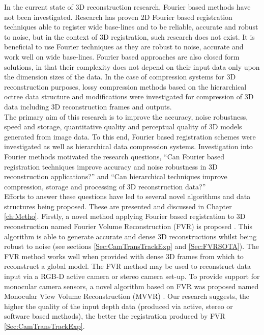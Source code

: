 In the current state of 3D reconstruction research, Fourier based methods have not been investigated. Research has proven 2D Fourier based registration techniques able to register wide base-lines and to be reliable, accurate and robust to noise, but in the context of 3D registration, such research does not exist. It is beneficial to use Fourier techniques as they are robust to noise, accurate and work well on wide base-lines. Fourier based approaches are also closed form solutions, in that their complexity does not depend on their input data only upon the dimension sizes of the data. In the case of compression systems for 3D reconstruction purposes, lossy compression methods based on the hierarchical octree data structure and modifications \cite{Lincoln13Interpolating} were investigated for compression of 3D data including 3D reconstruction frames and outputs. \\

The primary aim of this research is to improve the accuracy, noise robustness, speed and storage, quantitative quality and perceptual quality of 3D models generated from image data. To this end, Fourier based registration schemes were investigated as well as hierarchical data compression systems. Investigation into Fourier methods motivated the research questions, ``Can Fourier based registration techniques improve accuracy and noise robustness in 3D reconstruction applications?'' and ``Can hierarchical techniques improve compression, storage and processing of 3D reconstruction data?'' \\

Efforts to answer these questions have led to several novel algorithms and data structures being proposed. These are presented and discussed in Chapter \ref{ch:Metho}. Firstly, a novel method applying Fourier based registration to 3D reconstruction named Fourier Volume Reconstruction (FVR) is proposed \cite{Lincoln16Fourier,Lincoln16Dense}. This algorithm is able to generate accurate and dense 3D reconstructions whilst being robust to noise (see sections \ref{Sec:CamTransTrackExp} and \ref{Sec:FVRSOTA}). The FVR method works well when provided with dense 3D frames from which to reconstruct a global model. The FVR method may be used to reconstruct data input via a RGB-D active camera or stereo camera set-up. To provide support for monocular camera sensors, a novel algorithm based on FVR was proposed named Monocular View Volume Reconstruction (MVVR) \cite{Lincoln16Monocular}. Our research suggests, the higher the quality of the input depth data (produced via active, stereo or software based methods), the better the registration produced by FVR \ref{Sec:CamTransTrackExp}. \\

